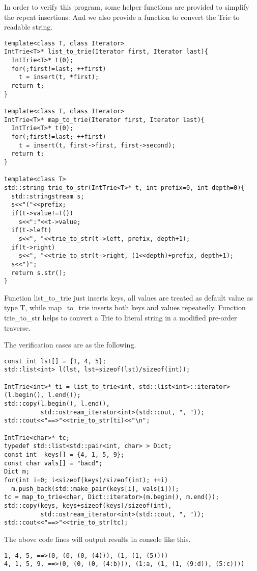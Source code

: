 \documentclass{article}
\begin{document}
In order to verify this program, some helper functions are provided to
simplify the repeat insertions. And we also provide a function to convert
the Trie to readable string.

\begin{lstlisting}
template<class T, class Iterator>
IntTrie<T>* list_to_trie(Iterator first, Iterator last){
  IntTrie<T>* t(0);
  for(;first!=last; ++first)
    t = insert(t, *first);
  return t;
}

template<class T, class Iterator>
IntTrie<T>* map_to_trie(Iterator first, Iterator last){
  IntTrie<T>* t(0);
  for(;first!=last; ++first)
    t = insert(t, first->first, first->second);
  return t;
}

template<class T>
std::string trie_to_str(IntTrie<T>* t, int prefix=0, int depth=0){
  std::stringstream s;
  s<<"("<<prefix;
  if(t->value!=T())
    s<<":"<<t->value;
  if(t->left)
    s<<", "<<trie_to_str(t->left, prefix, depth+1);
  if(t->right)
    s<<", "<<trie_to_str(t->right, (1<<depth)+prefix, depth+1);
  s<<")";
  return s.str();
}
\end{lstlisting}

Function list\_to\_trie just inserts keys, all values are treated as default
value as type T, while map\_to\_trie inserts both keys and values repeatedly.
Function trie\_to\_str helps to convert a Trie to literal string in a modified
pre-order traverse.

The verification cases are as the following.

\begin{lstlisting}
const int lst[] = {1, 4, 5};
std::list<int> l(lst, lst+sizeof(lst)/sizeof(int));

IntTrie<int>* ti = list_to_trie<int, std::list<int>::iterator>(l.begin(), l.end());
std::copy(l.begin(), l.end(), 
          std::ostream_iterator<int>(std::cout, ", "));
std::cout<<"==>"<<trie_to_str(ti)<<"\n";
    
IntTrie<char>* tc;
typedef std::list<std::pair<int, char> > Dict;
const int  keys[] = {4, 1, 5, 9};
const char vals[] = "bacd";
Dict m;
for(int i=0; i<sizeof(keys)/sizeof(int); ++i)
  m.push_back(std::make_pair(keys[i], vals[i]));
tc = map_to_trie<char, Dict::iterator>(m.begin(), m.end());
std::copy(keys, keys+sizeof(keys)/sizeof(int),
          std::ostream_iterator<int>(std::cout, ", "));
std::cout<<"==>"<<trie_to_str(tc);
\end{lstlisting}

The above code lines will output results in console like this.
\begin{verbatim}
1, 4, 5, ==>(0, (0, (0, (4))), (1, (1, (5))))
4, 1, 5, 9, ==>(0, (0, (0, (4:b))), (1:a, (1, (1, (9:d)), (5:c))))
\end{verbatim}
\end{document}
